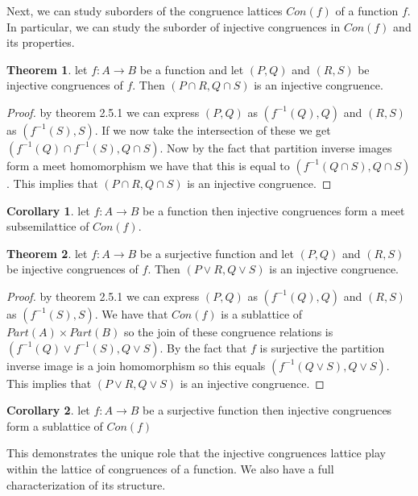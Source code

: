 \documentclass[a4paper,11pt, notitlepage]{report}
\theoremstyle{definition}
\newtheorem{theorem}{Theorem}[section]
\newtheorem{corollary}{Corollary}[section]
\begin{document}
Next, we can study suborders of the congruence lattices $Con(f)$ of a function $f$. In particular, we can study the suborder of injective congruences in $Con(f)$ and its properties.

\begin{theorem}
let $f: A \to B$ be a function and let $(P,Q)$ and $(R,S)$ be injective congruences of $f$. Then $(P \cap R, Q \cap S)$ is an injective congruence.
\end{theorem}

\begin{proof}
by theorem 2.5.1 we can express $(P,Q)$ as $(f^{-1}(Q),Q)$ and $(R,S)$ as $(f^{-1}(S),S)$. If we now take the intersection of these we get $(f^{-1}(Q) \cap f^{-1}(S), Q \cap S)$. Now by the fact that partition inverse images form a meet homomorphism we have that this is equal to $(f^{-1}(Q \cap S), Q \cap S)$. This implies that $(P \cap R, Q \cap S)$ is an injective congruence.
\end{proof}

\begin{corollary}
let $f: A \to B$ be a function then injective congruences form a meet subsemilattice of $Con(f)$.
\end{corollary}

\begin{theorem}
let $f: A \to B$ be a surjective function and let $(P,Q)$ and $(R,S)$ be injective congruences of $f$. Then $(P \vee R, Q \vee S)$ is an injective congruence.
\end{theorem}

\begin{proof}
by theorem 2.5.1 we can express $(P,Q)$ as $(f^{-1}(Q),Q)$ and $(R,S)$ as $(f^{-1}(S),S)$. We have that $Con(f)$ is a sublattice of $Part(A) \times Part(B)$ so the join of these congruence relations is $(f^{-1}(Q) \vee f^{-1}(S), Q \vee S)$. By the fact that $f$ is surjective the partition inverse image is a join homomorphism so this equals $(f^{-1}(Q \vee S), Q \vee S)$. This implies that $(P \vee R, Q \vee S)$ is an injective congruence.
\end{proof}

\begin{corollary}
let $f: A \to B$ be a surjective function then injective congruences form a sublattice of $Con(f)$
\end{corollary}

This demonstrates the unique role that the injective congruences lattice play within the lattice of congruences of a function. We also have a full characterization of its structure.
\end{document}
